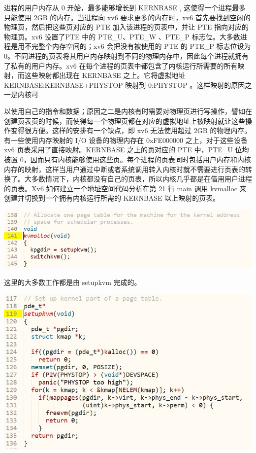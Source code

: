 进程的用户内存从 0 开始，最多能够增长到 KERNBASE , 这使得一个进程最多只能使用 2GB 的内存。当进程向 xv6 要求更多的内存时，xv6 首先要找到空闲的物理页，然后把这些页对应的  PTE  加入该进程的页表中，并让  PTE  指向对应的物理页。xv6  设置了PTE 中的 PTE\_U、PTE\_W 、PTE\_P 标志位。大多数进程是用不完整个内存空间的；xv6 会把没有被使用的 PTE 的 PTE\_P 标志位设为 0。不同进程的页表将其用户内存映射到不同的物理内存中，因此每个进程就拥有了私有的用户内存。xv6 在每个进程的页表中都包含了内核运行所需要的所有映射，而这些映射都出现在  KERNBASE  之上。它将虚拟地址KERNBASE:KERNBASE+PHYSTOP  映射到   0:PHYSTOP  。这样映射的原因之一是内核可

以使用自己的指令和数据；原因之二是内核有时需要对物理页进行写操作，譬如在创建页表页的时候，而使得每一个物理页都在对应的虚拟地址上被映射就让这些操作变得很方便。这样的安排有一个缺点，即 xv6 无法使用超过 2GB 的物理内存。有一些使用内存映射的 I/O 设备的物理内存在 0xFE000000 之上，对于这些设备 xv6 页表采用了直接映射。KERNBASE 之上的页对应的 PTE 中，PTE\_U 位均被置 0，因而只有内核能够使用这些页。每个进程的页表同时包括用户内存和内核内存的映射，这样当用户通过中断或者系统调用转入内核时就不需要进行页表的转换了。大多数情况下，内核都没有自己的页表，所以内核几乎都是在借用用户进程的页表。Xv6 如何建立一个地址空间代码分析在第 21 行 main 调用 kvmalloc 来创建并切换到一个拥有内核运行所需的 KERNBASE 以上映射的页表。

\includegraphics[width=6in]{figures/mem/fig6.png}

这里的大多数工作都是由 setupkvm 完成的。

\includegraphics[width=6in]{figures/mem/fig7.png}

